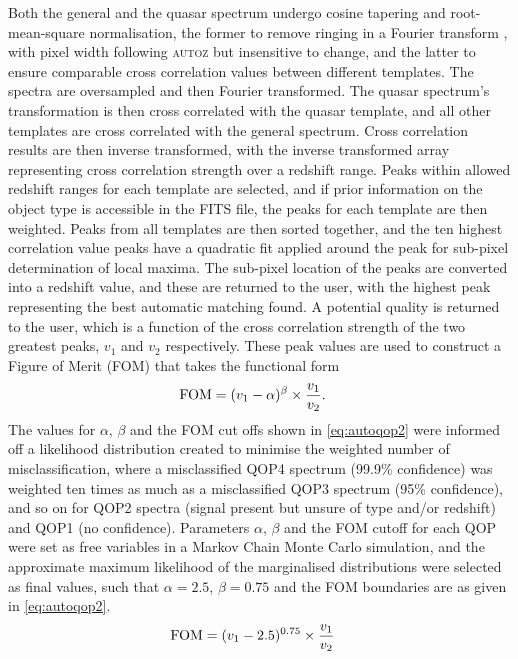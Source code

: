 \documentclass[iop]{emulateapj}
\newcommand{\autoz}{\textsc{autoz}}
\begin{document}
Both the general and the quasar spectrum undergo cosine tapering and root-mean-square normalisation, the former to remove ringing in a Fourier transform \citep[apodization;][]{kurtz1998rvsao}, with pixel width following \autoz{} but insensitive to change, and the latter to ensure comparable cross correlation values between different templates. The spectra are oversampled and then Fourier transformed. The quasar spectrum's transformation is then cross correlated with the quasar template, and all other templates are cross correlated with the general spectrum. Cross correlation results are then inverse transformed, with the inverse transformed array representing cross correlation strength over a redshift range. Peaks within allowed redshift ranges for each template are selected, and if prior information on the object type is accessible in the FITS file, the peaks for each template are then weighted. Peaks from all templates are then sorted together, and the ten highest correlation value peaks have a quadratic fit applied around the peak for sub-pixel determination of local maxima. The sub-pixel location of the peaks are converted into a redshift value, and these are returned to the user, with the highest peak representing the best automatic matching found. A potential quality is returned to the user, which is a function of the cross correlation strength of the two greatest peaks, $v_1$ and $v_2$ respectively. These peak values are used to construct a Figure of Merit (FOM) that takes the functional form
\begin{align}
{\rm FOM} &= (v_1-\alpha)^{\beta} \times \frac{v_1}{v_2}. \label{eq:autoqop}
\end{align}
The values for $\alpha$, $\beta$ and the FOM cut offs shown in \eqref{eq:autoqop2} were informed off a likelihood distribution created to minimise the weighted number of misclassification, where a misclassified QOP4 spectrum (99.9\% confidence) was weighted ten times as much as a misclassified QOP3 spectrum (95\% confidence), and so on for QOP2 spectra (signal present but unsure of type and/or redshift) and QOP1 (no confidence). Parameters $\alpha$, $\beta$ and the FOM cutoff for each QOP were set as free variables in a Markov Chain Monte Carlo simulation, and the approximate maximum likelihood of the marginalised distributions were selected as final values, such that $\alpha = 2.5$, $\beta = 0.75$ and the FOM boundaries are as given in \eqref{eq:autoqop2}.
\begin{align}
{\rm FOM} &= (v_1-2.5)^{0.75} \times \frac{v_1}{v_2} \label{eq:autoqop3}
\end{align}
\end{document}
